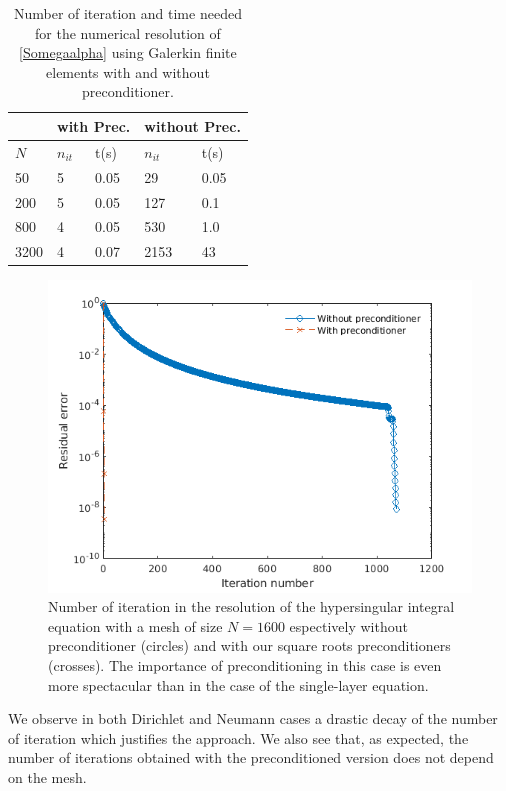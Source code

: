 \documentclass[a4paper]{article}
\begin{document}
\begin{table}[H]
	\begin{center}
		\begin{tabular}{m{4em} | m{4em} | m{4em} | m{4em} | m{4em}} 
			\hline
			\multicolumn{1}{c|}{ }&
			\multicolumn{2}{c|}{with Prec.}&\multicolumn{2}{c}{without Prec.}\\
			\hline
			$N$ & $n_{it}$& t(s) & $n_{it}$ & t(s)\\
			\hline\hline
			50 & 5 & 0.05 & 29 & 0.05\\
			\hline
			200 & 5 & 0.05 & 127 & 0.1\\
			\hline
			800 & 4 & 0.05 & 530 & 1.0 \\
			\hline
			3200 & 4 & 0.07 & 2153 & 43\\
			\hline
		\end{tabular}
	\end{center}
	\caption{Number of iteration and time needed for the numerical resolution of \eqref{Somegaalpha} using Galerkin finite elements with and without preconditioner.}
	\label{TableNitTimeLaplaceNeumann}
\end{table}
\vspace{-0.7cm}
\begin{figure}[H]
	\centering
	\includegraphics[scale=0.5]{figs/PrecondNeumannLaplaceSegbis.png}
	\caption{Number of iteration in the resolution of the hypersingular  integral equation with a mesh of size $N = 1600$ espectively without preconditioner (circles) and with our square roots preconditioners (crosses). The importance of preconditioning 
	in this case is even more spectacular than in the case of the single-layer equation.}
	\label{FigureNitLaplaceNeumann}
\end{figure}
We observe in both Dirichlet and Neumann cases a drastic decay of the number of iteration which justifies the approach. We also see that, 
as expected, the number of iterations obtained with the preconditioned version does not depend on the mesh.
\end{document}
